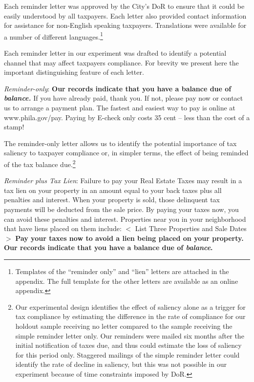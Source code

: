 \documentclass[12pt]{article}
\begin{document}
Each reminder letter was approved by the City's DoR to ensure that it
could be easily understood by all taxpayers.  Each letter also
provided contact information for assistance for non-English speaking
taxpayers.  Translations were available for a number of different
languages.\footnote{Templates of the ``reminder only'' and ``lien''
  letters are attached in the appendix.  The full template for the
  other letters are available as an online appendix.}

Each reminder letter in our experiment was drafted to identify a
potential channel that may affect taxpayers compliance. For brevity
we present here the important distinguishing feature of each letter.

\noindent \textit{Reminder-only}: \textbf{Our records indicate
that you have a balance due of \textit{balance. }} If you have
already paid, thank you.  If not, please pay now or contact us
to arrange a payment plan.  The fastest and easiest way to pay is
online at  www.phila.gov/pay. Paying by E-check only costs 35 cent
-- less than the cost of a stamp!

The reminder-only letter allows us to identify the potential
importance of tax saliency to taxpayer compliance or, in simpler terms,
the effect of being reminded of the tax balance due.\footnote{ Our
  experimental design identifies the effect of saliency alone as a
  trigger for tax compliance by estimating the difference in the rate
  of compliance for our holdout sample receiving no letter compared to
  the sample receiving the simple reminder letter only.  Our reminders
  were mailed six months after the initial notification of taxes due,
  and thus could estimate the loss of saliency for this period
  only. Staggered mailings of the simple reminder letter could
  identify the rate of decline in saliency, but this was not possible
  in our experiment because of time constraints imposed by DoR.}

\noindent \textit{Reminder plus Tax Lien}: Failure to pay your Real
Estate Taxes may result in a tax lien on your property in an amount
equal to your back taxes plus all penalties and interest.  When your
property is sold, those delinquent tax payments will be deducted from
the sale price.  By paying your taxes now, you can avoid these
penalties and interest.  Properties near you in your neighborhood that
have liens placed on them include: $<$ List Three Properties and Sale
Dates $>$ \textbf{Pay your taxes now to avoid a lien being placed on
  your property.  Our records indicate that you have a balance due of
  \textit{balance}.}
\end{document}
